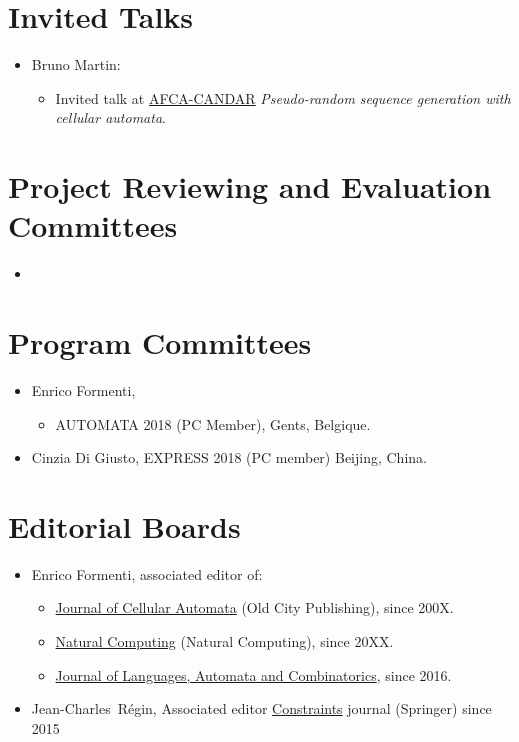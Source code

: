 \documentclass[a4paper]{article}
\newcommand{\nome}[1]{#1}
\newcommand{\cognome}[1]{#1}
\newcommand{\person}[2]{\nome{#1}\ \cognome{#2}\xspace}
\newcommand{\JCR}{\person{Jean-Charles}{Régin}}
\begin{document}
\section{Invited Talks}

\begin{itemize}
 \item Bruno Martin:
 \begin{itemize}
     \item Invited talk at \href{https://is-candar.org/afca18}{AFCA-CANDAR} \emph{Pseudo-random sequence generation with cellular automata}.
 \end{itemize}
\end{itemize}

\section{Project Reviewing and Evaluation Committees}

\begin{itemize}
\item
 \end{itemize}
 


\section{Program Committees}

\begin{itemize}


\item Enrico Formenti, 
\begin{itemize}
\item AUTOMATA 2018 (PC Member), Gents, Belgique.
\end{itemize}
\item Cinzia Di Giusto, EXPRESS 2018 (PC member) Beijing, China.
\end{itemize}

\section{Editorial Boards}
\begin{itemize}

 \item Enrico Formenti, associated editor of:
 \begin{itemize}
 \item \href{http://www.oldcitypublishing.com/journals/jca-home/}{Journal of Cellular Automata} (Old City Publishing), since 200X.
 \item \href{http://www.springer.com/computer/theoretical+computer+science/journal/11047}{Natural Computing} (Natural Computing), since 20XX.
 \item \href{http://www.jalc.de}{Journal of Languages, Automata and Combinatorics}, since 2016.
 \end{itemize}
 \item \JCR, Associated editor \href{https://link.springer.com/journal/10601}{Constraints} journal (Springer) since 2015
\end{itemize}
\end{document}
